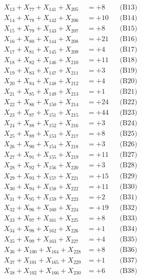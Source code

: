 \documentclass[a4paper,10pt]{article}
\begin{document}
{\begin{align}
X_{13} + X_{77} + X_{141} + X_{205} &= +8 && \text{(B13)} \\
X_{14} + X_{78} + X_{142} + X_{206} &= +10 && \text{(B14)} \\
X_{15} + X_{79} + X_{143} + X_{207} &= +8 && \text{(B15)} \\
\allowbreak
X_{16} + X_{80} + X_{144} + X_{208} &= +21 && \text{(B16)} \\
X_{17} + X_{81} + X_{145} + X_{209} &= +4 && \text{(B17)} \\
X_{18} + X_{82} + X_{146} + X_{210} &= +11 && \text{(B18)} \\
X_{19} + X_{83} + X_{147} + X_{211} &= +3 && \text{(B19)} \\
X_{20} + X_{84} + X_{148} + X_{212} &= +4 && \text{(B20)} \\
\allowbreak
X_{21} + X_{85} + X_{149} + X_{213} &= +1 && \text{(B21)} \\
X_{22} + X_{86} + X_{150} + X_{214} &= +24 && \text{(B22)} \\
X_{23} + X_{87} + X_{151} + X_{215} &= +44 && \text{(B23)} \\
X_{24} + X_{88} + X_{152} + X_{216} &= +3 && \text{(B24)} \\
X_{25} + X_{89} + X_{153} + X_{217} &= +8 && \text{(B25)} \\
\allowbreak
X_{26} + X_{90} + X_{154} + X_{218} &= +3 && \text{(B26)} \\
X_{27} + X_{91} + X_{155} + X_{219} &= +11 && \text{(B27)} \\
X_{28} + X_{92} + X_{156} + X_{220} &= +3 && \text{(B28)} \\
X_{29} + X_{93} + X_{157} + X_{221} &= +15 && \text{(B29)} \\
X_{30} + X_{94} + X_{158} + X_{222} &= +11 && \text{(B30)} \\
\allowbreak
X_{31} + X_{95} + X_{159} + X_{223} &= +2 && \text{(B31)} \\
X_{32} + X_{96} + X_{160} + X_{224} &= +19 && \text{(B32)} \\
X_{33} + X_{97} + X_{161} + X_{225} &= +8 && \text{(B33)} \\
X_{34} + X_{98} + X_{162} + X_{226} &= +1 && \text{(B34)} \\
X_{35} + X_{99} + X_{163} + X_{227} &= +4 && \text{(B35)} \\
\allowbreak
X_{36} + X_{100} + X_{164} + X_{228} &= +8 && \text{(B36)} \\
X_{37} + X_{101} + X_{165} + X_{229} &= +1 && \text{(B37)} \\
X_{38} + X_{102} + X_{166} + X_{230} &= +6 && \text{(B38)} \\

\end{align}}
\end{document}

